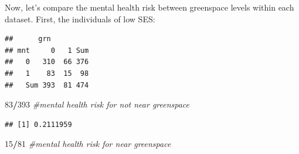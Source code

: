 \documentclass[
]{book}
\newenvironment{Shaded}{\begin{snugshade}}{\end{snugshade}}
\newcommand{\AttributeTok}[1]{\textcolor[rgb]{0.13,0.29,0.53}{#1}}
\newcommand{\CommentTok}[1]{\textcolor[rgb]{0.56,0.35,0.01}{\textit{#1}}}
\newcommand{\DecValTok}[1]{\textcolor[rgb]{0.00,0.00,0.81}{#1}}
\newcommand{\FunctionTok}[1]{\textcolor[rgb]{0.13,0.29,0.53}{\textbf{#1}}}
\newcommand{\NormalTok}[1]{#1}
\newcommand{\OtherTok}[1]{\textcolor[rgb]{0.56,0.35,0.01}{#1}}
\newcommand{\SpecialCharTok}[1]{\textcolor[rgb]{0.81,0.36,0.00}{\textbf{#1}}}
\newcommand{\StringTok}[1]{\textcolor[rgb]{0.31,0.60,0.02}{#1}}
\begin{document}
\begin{Shaded}
\end{Shaded}

Now, let's compare the mental health risk between greenspace levels within each dataset. First, the individuals of low SES:

\begin{Shaded}
\end{Shaded}

\begin{verbatim}
##      grn
## mnt     0   1 Sum
##   0   310  66 376
##   1    83  15  98
##   Sum 393  81 474
\end{verbatim}

\begin{Shaded}
\begin{Highlighting}[]
\DecValTok{83}\SpecialCharTok{/}\DecValTok{393} \CommentTok{\#mental health risk for not near greenspace}
\end{Highlighting}
\end{Shaded}

\begin{verbatim}
## [1] 0.2111959
\end{verbatim}

\begin{Shaded}
\begin{Highlighting}[]
\DecValTok{15}\SpecialCharTok{/}\DecValTok{81} \CommentTok{\#mental health risk for near greenspace}
\end{Highlighting}
\end{Shaded}
\end{document}
